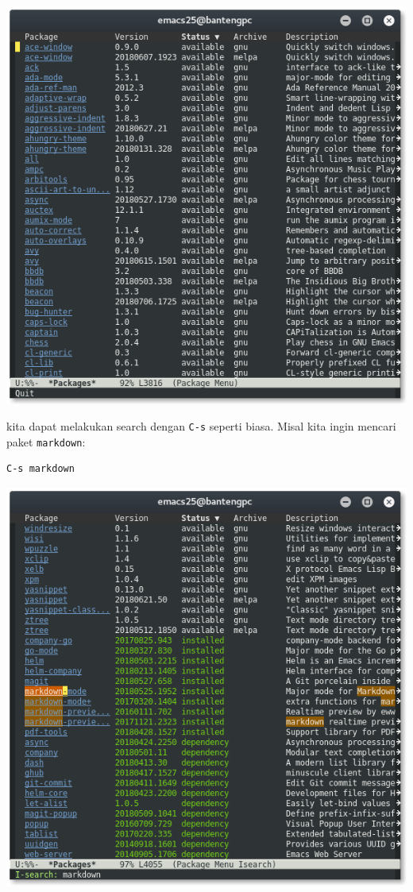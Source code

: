 \documentclass{article}
\begin{document}
\includegraphics[scale=0.6]{images/repo1.png} 

\vspace{12pt}

kita dapat melakukan search dengan \verb=C-s= seperti biasa. Misal 
kita ingin mencari paket \verb=markdown=:

\begin{verbatim}
C-s markdown
\end{verbatim}

\vspace{12pt}

\includegraphics[scale=0.6]{images/repo_search.png} 
\end{document}
